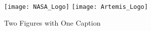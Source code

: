 \begin{figure}[H]
   \centering
   \texttt{[image: NASA\_Logo]}%
   \hspace{1in}%
   \texttt{[image: Artemis\_Logo]}%
   \caption{Two Figures with One Caption} 
   \label{fig:nasa-and-artemis-logo}
\end{figure}